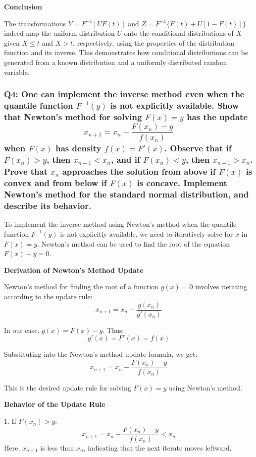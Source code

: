 \documentclass[8pt]{article}
\begin{document}
\textbf{Conclusion}

The transformations \(Y = F^{-1}[UF(t)]\) and \(Z = F^{-1}\{F(t) + U[1 - F(t)]\}\) indeed map the uniform distribution \(U\) onto the conditional distributions of \(X\) given \(X \leq t\) and \(X > t\), respectively, using the properties of the distribution function and its inverse. This demonstrates how conditional distributions can be generated from a known distribution and a uniformly distributed random variable.

\subsubsection*{Q4:
One can implement the inverse method even when the quantile function \(F^{-1}(y)\) is not explicitly available. Show that Newton's method for solving \(F(x) = y\) has the update
\[
x_{n+1} = x_n - \frac{F(x_n) - y}{f(x_n)}
\]
when \(F(x)\) has density \(f(x) = F'(x)\). Observe that if \(F(x_n) > y\), then \(x_{n+1} < x_n\), and if \(F(x_n) < y\), then \(x_{n+1} > x_n\). Prove that \(x_n\) approaches the solution from above if \(F(x)\) is convex and from below if \(F(x)\) is concave. Implement Newton's method for the standard normal distribution, and describe its behavior.}

To implement the inverse method using Newton's method when the quantile function \( F^{-1}(y) \) is not explicitly available, we need to iteratively solve for \( x \) in \( F(x) = y \). Newton's method can be used to find the root of the equation \( F(x) - y = 0 \).

\textbf{Derivation of Newton's Method Update}

Newton's method for finding the root of a function \( g(x) = 0 \) involves iterating according to the update rule:
\[
x_{n+1} = x_n - \frac{g(x_n)}{g'(x_n)}
\]

In our case, \( g(x) = F(x) - y \). Thus:
\[
g'(x) = F'(x) = f(x)
\]

Substituting into the Newton's method update formula, we get:
\[
x_{n+1} = x_n - \frac{F(x_n) - y}{f(x_n)}
\]

This is the desired update rule for solving \( F(x) = y \) using Newton's method.

\textbf{Behavior of the Update Rule}

1. If \( F(x_n) > y \):
   \[
   x_{n+1} = x_n - \frac{F(x_n) - y}{f(x_n)} < x_n
   \]
   Here, \( x_{n+1} \) is less than \( x_n \), indicating that the next iterate moves leftward.
\end{document}
